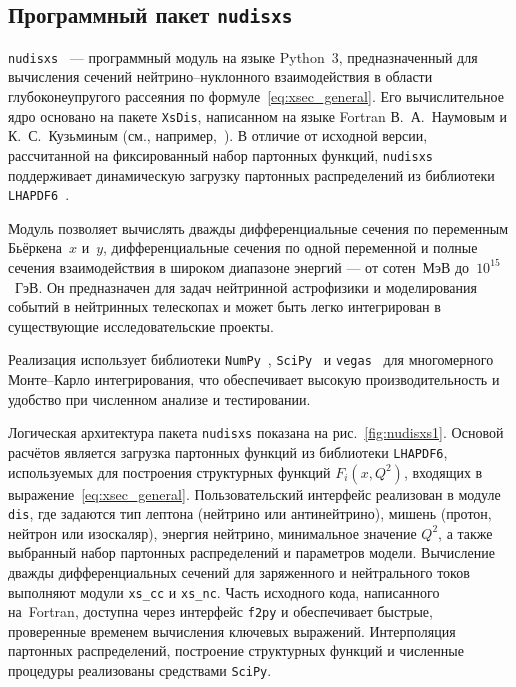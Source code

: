 \subsection{Программный пакет \texttt{nudisxs}}

\texttt{nudisxs}~\cite{nudisxs2022} — программный модуль на языке Python~3, предназначенный для вычисления сечений нейтрино–нуклонного взаимодействия в области глубоконеупругого рассеяния по формуле~\eqref{eq:xsec_general}. 
Его вычислительное ядро основано на пакете \texttt{XsDis}, написанном на языке Fortran В.~А.~Наумовым и К.~С.~Кузьминым (см., например,~\cite{nudisxs2022}). 
В отличие от исходной версии, рассчитанной на фиксированный набор партонных функций, \texttt{nudisxs} поддерживает динамическую загрузку партонных распределений из библиотеки \texttt{LHAPDF6}~\cite{aartsenLHAPDF2020}.

Модуль позволяет вычислять дважды дифференциальные сечения по переменным Бьёркена~$x$ и~$y$, дифференциальные сечения по одной переменной и полные сечения взаимодействия в широком диапазоне энергий — от сотен~МэВ до~$10^{15}$~ГэВ. 
Он предназначен для задач нейтринной астрофизики и моделирования событий в нейтринных телескопах и может быть легко интегрирован в существующие исследовательские проекты.

Реализация использует библиотеки \texttt{NumPy}~\cite{2020NumPy-Array}, \texttt{SciPy}~\cite{2020SciPy-NMeth} и \texttt{vegas}~\cite{lepageVegas2021} для многомерного Монте–Карло интегрирования, что обеспечивает высокую производительность и удобство при численном анализе и тестировании. 
%

Логическая архитектура пакета \texttt{nudisxs} показана на рис.~\ref{fig:nudisxs1}. 
Основой расчётов является загрузка партонных функций из библиотеки \texttt{LHAPDF6}, используемых для построения структурных функций $F_i(x, Q^2)$, входящих в выражение~\eqref{eq:xsec_general}. 
Пользовательский интерфейс реализован в модуле \texttt{dis}, где задаются тип лептона (нейтрино или антинейтрино), мишень (протон, нейтрон или изоскаляр), энергия нейтрино, минимальное значение $Q^2$, а также выбранный набор партонных распределений и параметров модели. 
Вычисление дважды дифференциальных сечений для заряженного и нейтрального токов выполняют модули \texttt{xs\_cc} и \texttt{xs\_nc}. 
Часть исходного кода, написанного на~Fortran, доступна через интерфейс \texttt{f2py} и обеспечивает быстрые, проверенные временем вычисления ключевых выражений. 
Интерполяция партонных распределений, построение структурных функций и численные процедуры реализованы средствами \texttt{SciPy}.

